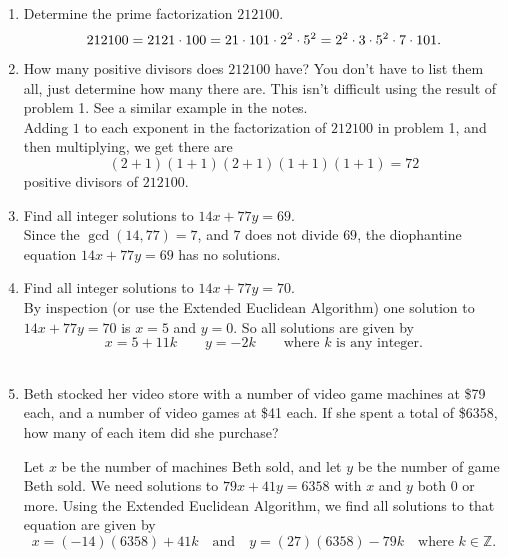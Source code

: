 \documentclass[11pt]{amsart}
\begin{document}
\begin{enumerate}

\item Determine the prime factorization $212100$.\\[3pt]

{\color{blue}
\[
212100 = 2121\cdot 100 = 21\cdot101\cdot 2^2\cdot5^2= 2^2\cdot3\cdot5^2\cdot7\cdot101.\\[5pt]
\]
}

\item How many positive divisors does $212100$ have?
You don't have to list them all, just determine how many there are. This isn't
difficult using the result of problem 1. See a similar example in the notes. \\[3pt]

{\color{blue}
Adding $1$ to each exponent in the factorization of $212100$ in problem 1, and then 
multiplying, we get there are
\[
(2+1)(1+1)(2+1)(1+1)(1+1) = 72
\]
positive divisors of $212100$.\\[5pt]
}

\vfill\break

\item  Find all integer solutions to $14x+ 77y = 69$.\\[3pt]

{\color{blue}
Since the $\gcd(14,77) = 7$, and $7$ does not divide $69$, the
diophantine equation $14x+77y = 69$ has no solutions.\\[5pt]
}

\item Find all integer solutions to $14x+ 77y = 70$.\\[3pt]

{\color{blue}
By inspection (or use the Extended Euclidean Algorithm) one solution
to  $14x+ 77y = 70$ is $x=5$ and $y=0$. So all solutions are given by
\[
x = 5 + 11k \qquad y = -2k \qquad \text{where $k$ is any integer.}
\]\\[5pt]
}


\item Beth stocked her video store with a number of video game 
machines at \$79 each, and a number of video games at \$41 each.
If she spent a total of \$6358, how many of each item did she purchase?\\[3pt]

{\color{blue}

Let $x$ be the number of machines Beth sold, and let $y$ be the number of game Beth sold.
We need solutions to $79x+41y = 6358$ with $x$ and $y$ both $0$ or more.
Using the Extended Euclidean Algorithm, we find all solutions to that equation are given by
\[
x = (-14)(6358)+41k \quad \text{and}\quad y = (27)(6358) - 79k \quad\text{where } k\in{\mathbb{Z}}.
\]

}
\end{enumerate}
\end{document}
